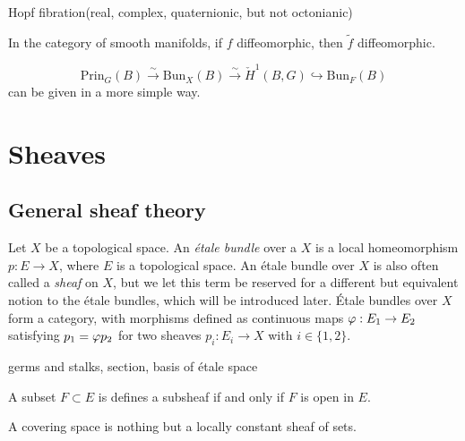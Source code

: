 \documentclass{../../large}
\begin{document}
Hopf fibration(real, complex, quaternionic, but not octonianic)

In the category of smooth manifolds, if $f$ diffeomorphic, then $\tilde f$ diffeomorphic.


\begin{prb}

\[\mathrm{Prin}_G(B)\xrightarrow{\sim}\mathrm{Bun}_X(B)\xrightarrow{\sim}\check H^1(B,G)\hookrightarrow\mathrm{Bun}_F(B)\]
can be given in a more simple way.

\end{prb}



\part{Sheaves}

\chapter{General sheaf theory}


\begin{prb}
Let $X$ be a topological space.
An \emph{\'etale bundle} over a $X$ is a local homeomorphism $p:E\to X$, where $E$ is a topological space.
An \'etale bundle over $X$ is also often called a \emph{sheaf} on $X$, but we let this term be reserved for a different but equivalent notion to the \'etale bundles, which will be introduced later.
\'Etale bundles over $X$ form a category, with morphisms defined as continuous maps $\varphi:E_1\to E_2$ satisfying $p_1=\varphi p_2$ for two sheaves $p_i:E_i\to X$ with $i\in\{1,2\}$.

germs and stalks, section, basis of \'etale space
\begin{parts}
\item A subset $F\subset E$ is defines a subsheaf if and only if $F$ is open in $E$.
\item A covering space is nothing but a locally constant sheaf of sets.
\item
\end{parts}
\end{prb}
\begin{pf}

\end{pf}
\end{document}
